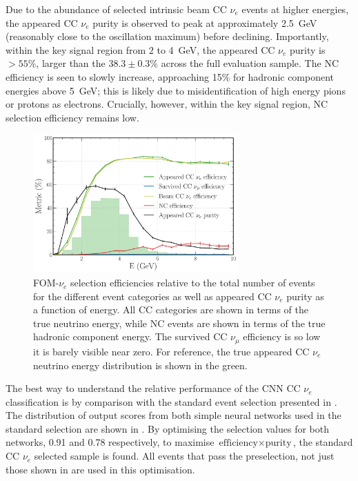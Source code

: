Due to the abundance of selected intrinsic beam CC $\nu_{e}$ events at higher energies, the
appeared CC $\nu_{e}$ purity is observed to peak at approximately \SI{2.5}{\GeV} (reasonably close
to the oscillation maximum) before declining. Importantly, within the key signal region from $2$
to \SI{4}{\GeV}, the appeared CC $\nu_{e}$ purity is $>55\%$, larger than the $38.3\pm0.3\%$
across the full evaluation sample. The NC efficiency is seen to slowly increase, approaching 15\%
for hadronic component energies above \SI{5}{\GeV}; this is likely due to misidentification of
high energy pions or protons as electrons. Crucially, however, within the key signal region, NC
selection efficiency remains low.

\begin{figure} %
    \includegraphics[width=0.7\textwidth]{diagrams/7-results/final_nuel_hists.pdf}
    \caption[Efficiency of the CC $\nu_{e}$ selection as a function of energy]
    {FOM-$\nu_e$ selection efficiencies relative to the total number of events for the different
        event categories as well as appeared CC $\nu_{e}$ purity as a function of energy. All CC
        categories are shown in terms of the true neutrino energy, while NC events are shown in
        terms of the true hadronic component energy. The survived CC $\nu_{\mu}$ efficiency is so
        low it is barely visible near zero. For reference, the true appeared CC $\nu_{e}$ neutrino
        energy distribution is shown in the green.}
    \label{fig:final_nuel_hists}
\end{figure}

The best way to understand the relative performance of the CNN CC $\nu_{e}$ classification is by
comparison with the standard event selection presented in . The
distribution of output scores from both simple neural networks used in the standard selection are
shown in . By optimising the selection values for both
networks, 0.91 and 0.78 respectively, to maximise $\text{efficiency}\times\text{purity}$, the
standard CC $\nu_{e}$ selected sample is found. All events that pass the preselection, not just
those shown in  are used in this optimisation.

